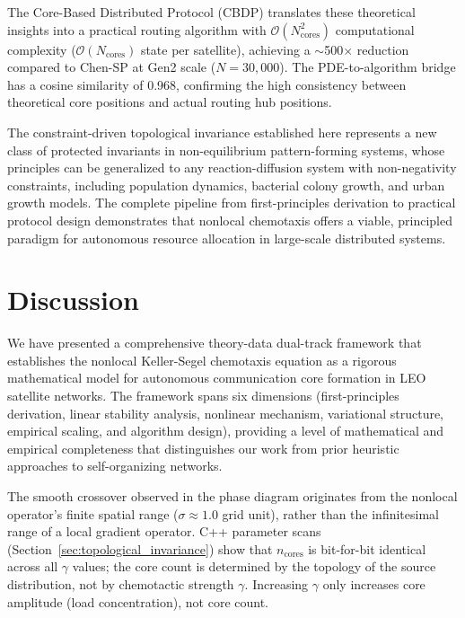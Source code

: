 \documentclass[sn-nature,pdflatex]{sn-jnl}
\begin{document}
The Core-Based Distributed Protocol (CBDP) translates these theoretical insights into a practical routing algorithm with $\mathcal{O}(N_{\text{cores}}^2)$ computational complexity ($\mathcal{O}(N_{\text{cores}})$ state per satellite), achieving a $\sim$500$\times$ reduction compared to Chen-SP at Gen2 scale ($N=30,000$). The PDE-to-algorithm bridge has a cosine similarity of 0.968, confirming the high consistency between theoretical core positions and actual routing hub positions.

The constraint-driven topological invariance established here represents a new class of protected invariants in non-equilibrium pattern-forming systems, whose principles can be generalized to any reaction-diffusion system with non-negativity constraints, including population dynamics, bacterial colony growth, and urban growth models. The complete pipeline from first-principles derivation to practical protocol design demonstrates that nonlocal chemotaxis offers a viable, principled paradigm for autonomous resource allocation in large-scale distributed systems.

\section{Discussion}
\label{sec:discussion}

We have presented a comprehensive theory-data dual-track framework that establishes the nonlocal Keller-Segel chemotaxis equation as a rigorous mathematical model for autonomous communication core formation in LEO satellite networks. The framework spans six dimensions (first-principles derivation, linear stability analysis, nonlinear mechanism, variational structure, empirical scaling, and algorithm design), providing a level of mathematical and empirical completeness that distinguishes our work from prior heuristic approaches to self-organizing networks.

The smooth crossover observed in the phase diagram originates from the nonlocal operator's finite spatial range ($\sigma \approx 1.0$ grid unit), rather than the infinitesimal range of a local gradient operator. C++ parameter scans (Section~\ref{sec:topological_invariance}) show that $n_{\text{cores}}$ is bit-for-bit identical across all $\gamma$ values; the core count is determined by the topology of the source distribution, not by chemotactic strength $\gamma$. Increasing $\gamma$ only increases core amplitude (load concentration), not core count.
\end{document}
